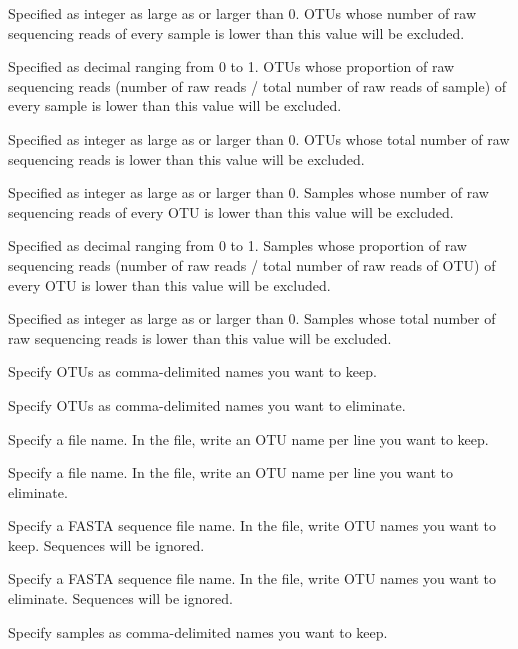 \documentclass[titlepage,10pt,a4paper,english]{jsbook}
\begin{document}
\begin{description}\small\setlength{\baselineskip}{1.1em}
\item[\texttt{{-}{-}minnseqotu}] Specified as integer as large as or larger than 0.
OTUs whose number of raw sequencing reads of every sample is lower than this value will be excluded.
\item[\texttt{{-}{-}minpseqotu}] Specified as decimal ranging from 0 to 1.
OTUs whose proportion of raw sequencing reads (number of raw reads / total number of raw reads of sample) of every sample is lower than this value will be excluded.
\item[\texttt{{-}{-}minntotalseqotu}] Specified as integer as large as or larger than 0.
OTUs whose total number of raw sequencing reads is lower than this value will be excluded.
\item[\texttt{{-}{-}minnseqsample}] Specified as integer as large as or larger than 0.
Samples whose number of raw sequencing reads of every OTU is lower than this value will be excluded.
\item[\texttt{{-}{-}minpseqsample}] Specified as decimal ranging from 0 to 1.
Samples whose proportion of raw sequencing reads (number of raw reads / total number of raw reads of OTU) of every OTU is lower than this value will be excluded.
\item[\texttt{{-}{-}minntotalseqsample}] Specified as integer as large as or larger than 0.
Samples whose total number of raw sequencing reads is lower than this value will be excluded.
\item[\texttt{{-}{-}otu}] Specify OTUs as comma-delimited names you want to keep.
\item[\texttt{{-}{-}negativeotu}] Specify OTUs as comma-delimited names you want to eliminate.
\item[\texttt{{-}{-}otulist}] Specify a file name.
In the file, write an OTU name per line you want to keep.
\item[\texttt{{-}{-}negativeotulist}] Specify a file name.
In the file, write an OTU name per line you want to eliminate.
\item[\texttt{{-}{-}otuseq}] Specify a FASTA sequence file name.
In the file, write OTU names you want to keep. Sequences will be ignored.
\item[\texttt{{-}{-}negativeotuseq}] Specify a FASTA sequence file name.
In the file, write OTU names you want to eliminate. Sequences will be ignored.
\item[\texttt{{-}{-}sample}] Specify samples as comma-delimited names you want to keep.

\end{description}
\end{document}
